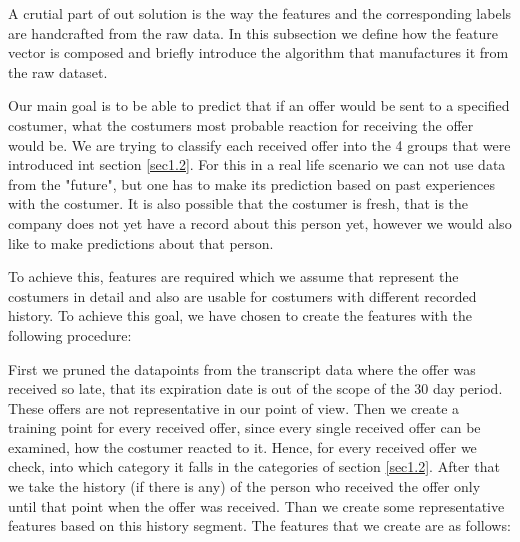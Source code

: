A crutial part of out solution is the way the features and the corresponding labels are handcrafted from the raw data. In this subsection we define how the feature vector is composed and briefly introduce the algorithm that manufactures it from the raw dataset.

Our main goal is to be able to predict that if an offer would be sent to a specified costumer, what the costumers most probable reaction for receiving the offer would be. We are trying to classify each received offer into the 4 groups that were introduced int section \ref{sec1.2}. For this in a real life scenario we can not use data from the "future", but one has to make its prediction based on past experiences with the costumer. It is also possible that the costumer is fresh, that is the company does not yet have a record about this person yet, however we would also like to make predictions about that person. 

To achieve this, features are required which we assume that represent the costumers in detail and also are usable for costumers with different recorded history. To achieve this goal, we have chosen to create the features with the following procedure: 

First we pruned the datapoints from the transcript data where the offer was received so late, that its expiration date is out of the scope of the 30 day period. These offers are not representative in our point of view. Then we create a training point for every received offer, since every single received offer can be examined, how the costumer reacted to it. Hence, for every received offer we check, into which category it falls in the categories of section \ref{sec1.2}. After that we take the history (if there is any) of the person who received the offer only until that point when the offer was received. Than we create some representative features based on this history segment. The features that we create are as follows:

